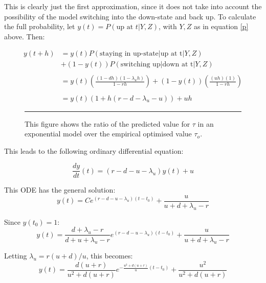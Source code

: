 This is clearly just the first approximation, since it does not take into account the possibility of the model switching into the down-state and back up.  To calculate the full probability, let $y(t) = P(\mbox{up at } t | Y , Z)$, with $Y,Z$ as in equation \ref{p} above.  Then:

\begin{equation}
\begin{split}
y(t+h) &=  y(t)P(\mbox{staying in up-state} | \mbox{up at t}|Y,Z)  \\
& + (1-y(t))P(\mbox{switching up} | \mbox{down at t}|Y,Z)\\
&\\
&= y(t)\left( \frac{(1-dh)(1-\lambda_uh)}{1-rh} \right) + (1-y(t)) \left(\frac{(uh)(1)}{1-rh}  \right)\\
&\\
& = y(t)\left( 1 + h(r-d-\lambda_u-u ) \right) + uh
\end{split}
\end{equation}

\begin{figure}[b!]
\begin{center}
\resizebox{0.75\textwidth}{!}{}
\bigskip
\rule{31.5em}{0.5pt}
\caption{\label{predovertauopt} This figure shows the ratio of the predicted value for $\tau$ in an exponential model over the empirical optimised value $\tau_o$.}
\end{center}
\end{figure}

This leads to the following ordinary differential equation:

\begin{equation}
\frac{dy}{dt}(t) = \left( r - d - u - \lambda_u \right)y(t) + u
\end{equation}

This ODE has the general solution:
\begin{equation}
y(t) = Ce^{(r-d-u-\lambda_u)(t-t_0)} + \frac{u}{u+d+\lambda_u - r}
\end{equation}

Since $y(t_0) = 1$:
\begin{equation}
y(t) = \frac{d+\lambda_u - r}{d+u+\lambda_u -r} e^{(r-d-u-\lambda_u)(t-t_0)} + \frac{u}{u+d+\lambda_u-r}
\end{equation}

Letting $\lambda_u = r(u+d)/u$, this becomes:
\begin{equation}
y(t) = \frac{d(u+r)}{u^2 + d(u+r)} e^{-\frac{u^2+d(u+r)}{u}(t-t_0)} + \frac{u^2}{u^2+ d(u+r)}
\end{equation}


